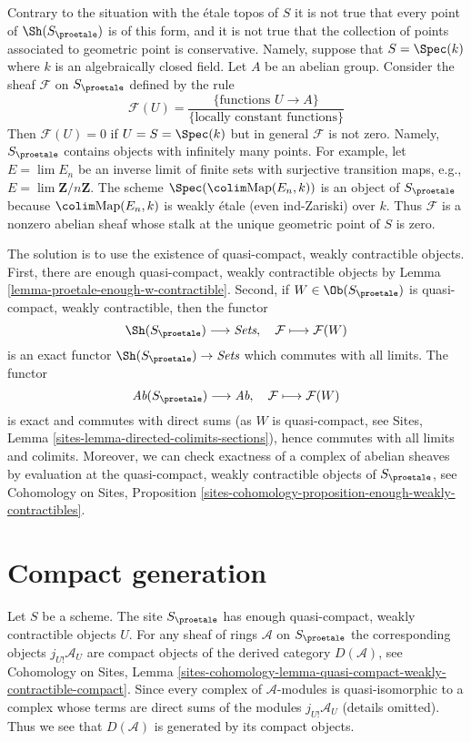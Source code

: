 \noindent
Contrary to the situation with the \'etale topos of $S$ it is not true
that every point of $\Sh(S_\proetale)$ is of this form, and it is not
true that the collection of points associated to geometric point is
conservative. Namely, suppose that $S = \Spec(k)$ where $k$ is an
algebraically closed field. Let $A$ be an abelian group.
Consider the sheaf $\mathcal{F}$ on $S_\proetale$ defined by the rule
$$
\mathcal{F}(U) = \frac{\{\text{functions }U \to A\}}%
{\{\text{locally constant functions}\}}
$$
Then $\mathcal{F}(U) = 0$ if $U = S = \Spec(k)$ but in general $\mathcal{F}$
is not zero. Namely, $S_\proetale$ contains objects with infinitely many
points. For example, let $E = \lim E_n$ be an inverse limit of
finite sets with surjective transition maps,
e.g., $E = \lim \mathbf{Z}/n\mathbf{Z}$.
The scheme $\Spec(\colim \text{Map}(E_n, k))$
is an object of $S_\proetale$ because $\colim \text{Map}(E_n, k)$
is weakly \'etale (even ind-Zariski) over $k$.
Thus $\mathcal{F}$ is a nonzero abelian sheaf whose stalk at the
unique geometric point of $S$ is zero.

\medskip\noindent
The solution is to use the existence of quasi-compact, weakly contractible
objects. First, there are enough quasi-compact, weakly contractible objects by
Lemma \ref{lemma-proetale-enough-w-contractible}.
Second, if $W \in \Ob(S_\proetale)$ is quasi-compact, weakly contractible,
then the functor
$$
\Sh(S_\proetale) \longrightarrow \textit{Sets},\quad
\mathcal{F} \longmapsto \mathcal{F}(W)
$$
is an exact functor $\Sh(S_\proetale) \to \textit{Sets}$ which commutes
with all limits. The functor
$$
\textit{Ab}(S_\proetale) \longrightarrow \textit{Ab},\quad
\mathcal{F} \longmapsto \mathcal{F}(W)
$$
is exact and commutes with direct sums (as $W$ is quasi-compact, see
Sites, Lemma \ref{sites-lemma-directed-colimits-sections}), hence
commutes with all limits and colimits. Moreover, we can check exactness of
a complex of abelian sheaves by evaluation at the
quasi-compact, weakly contractible objects of $S_\proetale$, see
Cohomology on Sites, Proposition
\ref{sites-cohomology-proposition-enough-weakly-contractibles}.




\section{Compact generation}
\label{section-compact-generation}

\noindent
Let $S$ be a scheme. The site $S_\proetale$ has enough quasi-compact,
weakly contractible objects $U$. For any sheaf of rings $\mathcal{A}$
on $S_\proetale$ the corresponding objects $j_{U!}\mathcal{A}_U$
are compact objects of the derived category $D(\mathcal{A})$, see
Cohomology on Sites, Lemma
\ref{sites-cohomology-lemma-quasi-compact-weakly-contractible-compact}.
Since every complex of $\mathcal{A}$-modules is quasi-isomorphic to
a complex whose terms are direct sums of the modules
$j_{U!}\mathcal{A}_U$ (details omitted). Thus we see that
$D(\mathcal{A})$ is generated by its compact objects.

